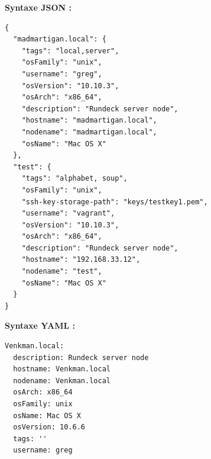 \documentclass[12pt]{article}
\begin{document}
\vspace{0.5cm}
\textbf{Syntaxe JSON :}
\\

\begin{lstlisting}
{
  "madmartigan.local": {
    "tags": "local,server",
    "osFamily": "unix",
    "username": "greg",
    "osVersion": "10.10.3",
    "osArch": "x86_64",
    "description": "Rundeck server node",
    "hostname": "madmartigan.local",
    "nodename": "madmartigan.local",
    "osName": "Mac OS X"
  },
  "test": {
    "tags": "alphabet, soup",
    "osFamily": "unix",
    "ssh-key-storage-path": "keys/testkey1.pem",
    "username": "vagrant",
    "osVersion": "10.10.3",
    "osArch": "x86_64",
    "description": "Rundeck server node",
    "hostname": "192.168.33.12",
    "nodename": "test",
    "osName": "Mac OS X"
  }
}
\end{lstlisting}

\vspace{0.5cm}
\textbf{Syntaxe YAML :}
\\

\begin{lstlisting}
Venkman.local:
  description: Rundeck server node
  hostname: Venkman.local
  nodename: Venkman.local
  osArch: x86_64
  osFamily: unix
  osName: Mac OS X
  osVersion: 10.6.6
  tags: ''
  username: greg
\end{lstlisting}
\end{document}
